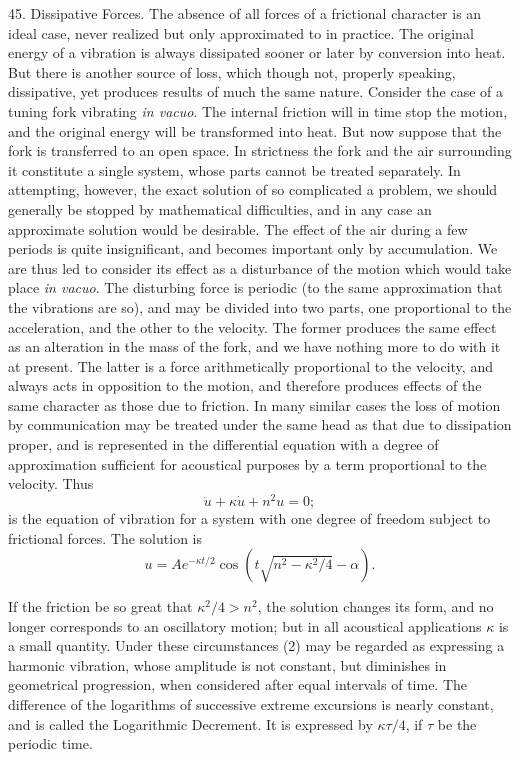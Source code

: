 45. Dissipative Forces.  The absence of all forces of a frictional character is
an ideal case, never realized but only approximated to in practice. The
original energy of a vibration is always dissipated sooner or later by
conversion into heat. But there is another source of loss, which though not,
properly speaking, dissipative, yet produces results of much the same nature.
Consider the case of a tuning fork vibrating \textit{in vacuo}. The internal
friction will in time stop the motion, and the original energy will be
transformed into heat. But now suppose that the fork is transferred to an open
space. In strictness the fork and the air surrounding it constitute a single
system, whose parts cannot be treated separately. In attempting, however, the
exact solution of so complicated a problem, we should generally be stopped by
mathematical difficulties, and in any case an approximate solution would be
desirable. The effect of the air during a few periods is quite insignificant,
and becomes important only by accumulation. We are thus led to consider its
effect as a disturbance of the motion which would take place \textit{in vacuo}.
The disturbing force is periodic (to the same approximation that the vibrations
are so), and may be divided into two parts, one proportional to the
acceleration, and the other to the velocity. The former produces the same
effect as an alteration in the mass of the fork, and we have nothing more to do
with it at present. The latter is a force arithmetically proportional to the
velocity, and always acts in opposition to the motion, and therefore produces
effects of the same character as those due to friction. In many similar cases
the loss of motion by communication may be treated under the same head as that
due to dissipation proper, and is represented in the differential equation with
a degree of approximation sufficient for acoustical purposes by a term
proportional to the velocity. Thus
\begin{equation}
\ddot{u} + \kappa \dot{u} + n^2 u = 0;
\end{equation}
is the equation of vibration for a
system with one degree of freedom subject to frictional forces. The solution is
\begin{equation}
u=A e^{-\kappa t/2}\cos \left(t \sqrt{n^2 - \kappa^2/4} -\alpha \right).
\end{equation}

If the friction be so great that \(\kappa^2/4 > n^2\),
the solution changes its form, and no longer corresponds to an oscillatory
motion; but in all acoustical applications
\(\kappa\)
is a small quantity. Under these
circumstances (2) may be regarded as expressing a harmonic vibration, whose
amplitude is not constant, but diminishes in geometrical progression, when
considered after equal intervals of time. The difference of the logarithms of
successive extreme excursions is nearly constant, and is called the Logarithmic
Decrement. It is expressed by
\(\kappa \tau/4\), if
\(\tau \)
be the periodic time.

